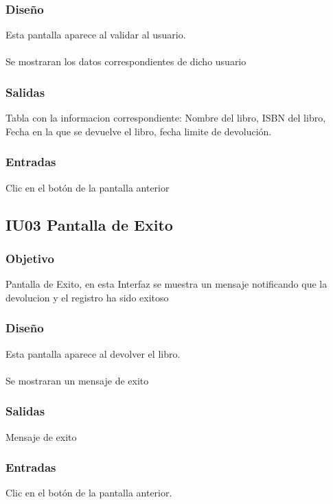 \subsubsection{Diseño}
	Esta pantalla aparece al validar al usuario.  \\\\
	Se mostraran los datos correspondientes de dicho usuario



\subsubsection{Salidas}
	\begin{Citemize}
		\item Tabla con la informacion correspondiente: Nombre del libro, ISBN del libro, Fecha en la que se devuelve el libro, fecha limite de devolución. 
	\end{Citemize}
	
\subsubsection{Entradas}
	\begin{Citemize}
		\item Clic en el botón  de la pantalla anterior
	\end{Citemize}







\subsection{IU03 Pantalla de Exito}

\subsubsection{Objetivo}
	Pantalla de Exito, en esta Interfaz se muestra un mensaje notificando que la devolucion y el registro ha sido exitoso  

\subsubsection{Diseño}
	Esta pantalla aparece al devolver el libro.  \\\\
	Se mostraran un mensaje de exito



\subsubsection{Salidas}
	\begin{Citemize}
		\item Mensaje de exito
	\end{Citemize}
	
\subsubsection{Entradas}
	\begin{Citemize}
		\item Clic en el botón  de la pantalla anterior. 
	\end{Citemize}





